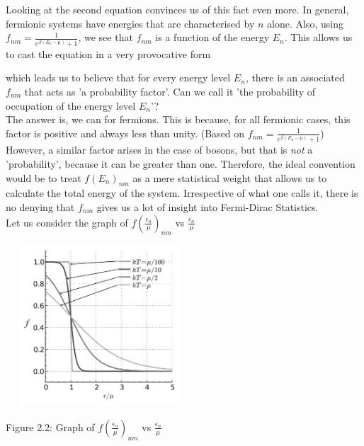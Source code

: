 \documentclass[oneside]{book}
\begin{document}
Looking at the second equation convinces us of this fact even more. In general, fermionic systems have energies that are characterised by $n$ alone. Also, using $f_{nm} = \frac{1}{e^{\beta(E_{n} - \mu)}+ 1} $, we see that $f_{nm}$ is a function of the energy $E_n$. This allows us to cast the equation in a very provocative form

\begin{center}
\end{center}

which leads us to believe that for every energy level $E_n$, there is an associated $f_{nm}$ that acts as 'a probability factor'. Can we call it 'the probability of occupation of the energy level $E_n$'?\\

The answer is, we can for fermions. This is because, for all fermionic cases, this factor is positive and always less than unity. (Based on $f_{nm} = \frac{1}{e^{\beta(E_{n} - \mu)}+ 1} $)\\

However, a similar factor arises in the case of bosons, but that is \emph{not} a 'probability', because it can be greater than one. Therefore, the ideal convention would be to treat $f(E_n)_{nm}$ as a mere statistical weight that allows us to calculate the total energy of the system. Irrespective of what one calls it, there is no denying that $f_{nm}$ gives us a lot of insight into Fermi-Dirac Statistics.\\

Let us consider the graph of $f(\frac{\epsilon_n}{\mu})_{nm}$ vs $\frac{\epsilon_n}{\mu}$


\begin{center}
\includegraphics[height = 6cm, width = 7cm]{Fermi}
\end{center}
\begin{center}
Figure 2.2: Graph of $f(\frac{\epsilon_n}{\mu})_{nm}$ vs $\frac{\epsilon_n}{\mu}$
\end{center}
\end{document}
